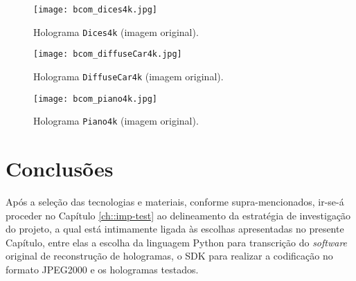 \begin{figure}
    \centering
    \texttt{[image: bcom\_dices4k.jpg]}
    \caption{Holograma \texttt{Dices4k} (imagem original).}
    \label{fig:bcom_dices4k}
\end{figure}

\begin{figure}
    \centering
    \texttt{[image: bcom\_diffuseCar4k.jpg]}
    \caption{Holograma \texttt{DiffuseCar4k} (imagem original).}
    \label{fig:bcom_diffuseCar4k}
\end{figure}

\begin{figure}
    \centering
    \texttt{[image: bcom\_piano4k.jpg]}
    \caption{Holograma \texttt{Piano4k} (imagem original).}
    \label{fig:bcom_piano4k}
\end{figure}


\section{Conclusões}
\label{sec::tecno-ferr:conclusao}

Após a seleção das tecnologias e materiais, conforme supra-mencionados, ir-se-á proceder no Capítulo \ref{ch::imp-test} ao delineamento da estratégia de investigação do projeto, a qual está intimamente ligada às escolhas apresentadas no presente Capítulo, entre elas a escolha da linguagem Python para transcrição do \textit{software} original de reconstrução de hologramas, o \ac{SDK} para realizar a codificação no formato JPEG2000 e os hologramas testados.
